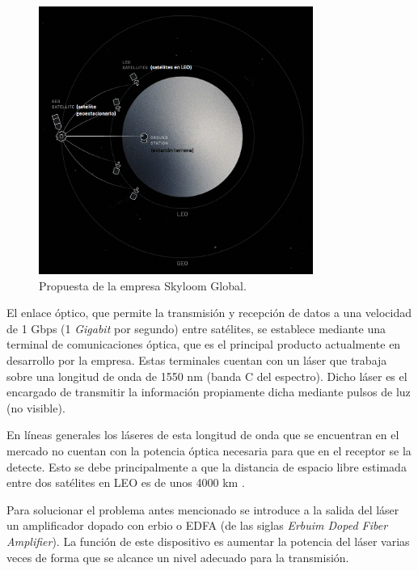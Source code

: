\begin{figure}[H]
\centering
\includegraphics[width=0.8\textwidth]{./Figures/propuesta_skyloom.png}
\caption{Propuesta de la empresa Skyloom Global\protect\footnotemark.}
\label{fig:propSky}
\end{figure}


El enlace óptico, que permite la transmisión y recepción de datos a una velocidad de 1 Gbps (1 \textit{Gigabit} por segundo) entre satélites, se establece mediante una terminal de comunicaciones óptica, que es el principal producto actualmente en desarrollo por la empresa. Estas terminales cuentan con un láser que trabaja sobre una longitud de onda de 1550 nm (banda C del espectro). Dicho láser es el encargado de transmitir la información propiamente dicha mediante pulsos de luz (no visible).

En líneas generales los láseres de esta longitud de onda que se encuentran en el mercado no cuentan con la potencia óptica necesaria para que en el receptor se la detecte. Esto se debe principalmente a que la distancia de espacio libre estimada entre dos satélites en LEO es de unos 4000 km \citep{WEBSITE_SKY}.

Para solucionar el problema antes mencionado se introduce a la salida del láser un amplificador dopado con erbio o EDFA (de las siglas \textit{Erbuim Doped Fiber Amplifier}). La función de este dispositivo es aumentar la potencia del láser varias veces de forma que se alcance un nivel adecuado para la transmisión.

